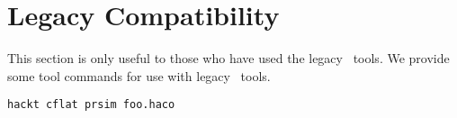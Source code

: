 
\chapter{Legacy Compatibility}
\label{sec:legacy}

This section is only useful to those who have used the legacy \CAST\ tools.  
We provide some tool commands for use with legacy \CAST\ tools.  

\begin{verbatim}
hackt cflat prsim foo.haco
\end{verbatim}

